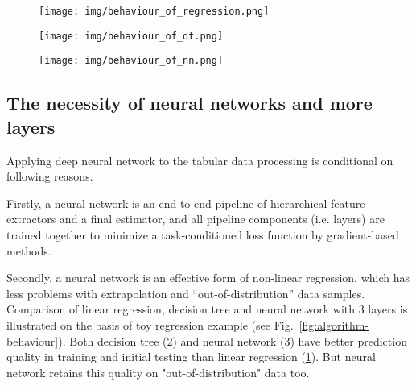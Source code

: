 \documentclass{article}
\begin{document}
\begin{figure*}[hbt!]
 \centering
\begin{minipage}[h]{0.97\linewidth}
  \centering
  \begin{subfigure}[b]{0.321\textwidth}
    \centering
    \texttt{[image: img/behaviour\_of\_regression.png]}
    \caption{}
    \label{fig:regression-behaviour}
  \end{subfigure}
  \begin{subfigure}[b]{0.321\textwidth}
    \centering
    \texttt{[image: img/behaviour\_of\_dt.png]}
    \caption{}
    \label{fig:tree-behaviour}
  \end{subfigure}
  \begin{subfigure}[b]{0.321\textwidth}
    \centering
    \texttt{[image: img/behaviour\_of\_nn.png]}
    \caption{}
    \label{fig:dnn-behaviour}
  \end{subfigure}
  \vspace{-0.1cm}
\end{minipage}
 \caption{An example on synthetic data. Blue points are data for training and initial testing. Orange points are new data to predict. Shown: (a) predictions of linear regression; (b) predictions of decision tree; (c) predictions of neural network.}
 \label{fig:algorithm-behaviour}
\end{figure*}

\subsection{The necessity of neural networks and more layers}

Applying deep neural network to the tabular data processing is conditional on following reasons.

Firstly, a neural network is an end-to-end pipeline of hierarchical feature extractors and a final estimator, and all pipeline components (i.e. layers) are trained together to minimize a task-conditioned loss function by gradient-based methods.

Secondly, a neural network is an effective form of non-linear regression, which has less problems with extrapolation and “out-of-distribution” data samples. Comparison of linear regression, decision tree and neural network with 3 layers is illustrated on the basis of toy regression example (see Fig.~\ref{fig:algorithm-behaviour}). Both decision tree (\ref{fig:tree-behaviour}) and neural network (\ref{fig:dnn-behaviour}) have better prediction quality in training and initial testing than linear regression (\ref{fig:regression-behaviour}). But neural network retains this quality on "out-of-distribution" data too.
\end{document}
